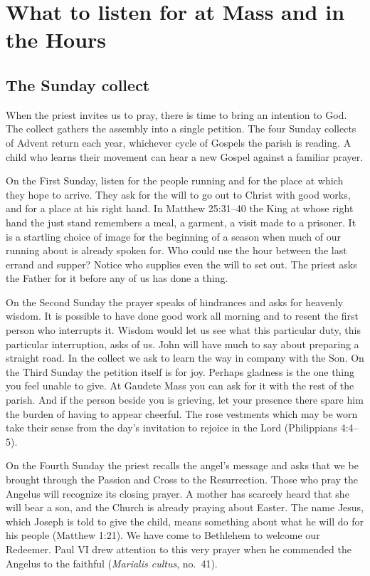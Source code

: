 \section{What to listen for at Mass and in the Hours}

\subsection{The Sunday collect}

When the priest invites us to pray, there is time to bring an intention to God. The collect gathers the assembly into a single petition. The four Sunday collects of Advent return each year, whichever cycle of Gospels the parish is reading. A child who learns their movement can hear a new Gospel against a familiar prayer.

On the First Sunday, listen for the people running and for the place at which they hope to arrive. They ask for the will to go out to Christ with good works, and for a place at his right hand. In Matthew 25:31--40 the King at whose right hand the just stand remembers a meal, a garment, a visit made to a prisoner. It is a startling choice of image for the beginning of a season when much of our running about is already spoken for. Who could use the hour between the last errand and supper? Notice who supplies even the will to set out. The priest asks the Father for it before any of us has done a thing.

On the Second Sunday the prayer speaks of hindrances and asks for heavenly wisdom. It is possible to have done good work all morning and to resent the first person who interrupts it. Wisdom would let us see what this particular duty, this particular interruption, asks of us. John will have much to say about preparing a straight road. In the collect we ask to learn the way in company with the Son. On the Third Sunday the petition itself is for joy. Perhaps gladness is the one thing you feel unable to give. At Gaudete Mass you can ask for it with the rest of the parish. And if the person beside you is grieving, let your presence there spare him the burden of having to appear cheerful. The rose vestments which may be worn take their sense from the day's invitation to rejoice in the Lord (Philippians 4:4--5).

On the Fourth Sunday the priest recalls the angel's message and asks that we be brought through the Passion and Cross to the Resurrection. Those who pray the Angelus will recognize its closing prayer. A mother has scarcely heard that she will bear a son, and the Church is already praying about Easter. The name Jesus, which Joseph is told to give the child, means something about what he will do for his people (Matthew 1:21). We have come to Bethlehem to welcome our Redeemer. Paul VI drew attention to this very prayer when he commended the Angelus to the faithful (\emph{Marialis cultus}, no.~41).

